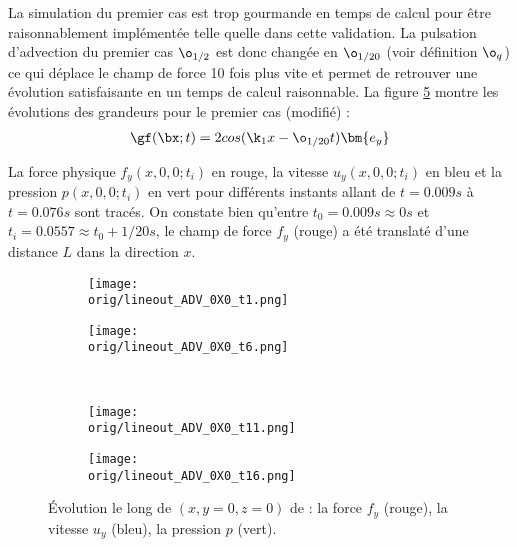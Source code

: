 La simulation du premier cas est trop gourmande en temps de calcul pour être raisonnablement implémentée telle quelle dans cette validation. La pulsation d'advection du premier cas $\o_{1/2}$ est donc changée en $\o_{1/20}$ (voir définition $\o_q$) ce qui déplace le champ de force 10 fois plus vite et permet de retrouver une évolution satisfaisante en un temps de calcul raisonnable. La figure \ref{fig : 0X0} montre les évolutions des grandeurs pour le premier cas (modifié) :
\begin{align}
\gf(\bx;t) = 2cos(\k_1 x - \o_{1/20}t) \bm{e_y}
\end{align} 

La force physique $f_y(x,0,0;t_i)$ en rouge, la vitesse $u_y(x,0,0;t_i)$ en bleu et la pression $p(x,0,0;t_i)$ en vert pour différents instants allant de $t=0.009s$ à $t=0.076s$ sont tracés. On constate bien qu'entre $t_0=0.009s \approx 0s$ et $t_i = 0.0557 \approx t_0 + 1/20 s$, le champ de force $f_y$ (rouge) a été translaté d'une distance $L$ dans la direction $x$. 

\begin{figure}
\begin{center}
	\begin{subfigure}[t]{0.4\textwidth}                                                                                                                                   
		\texttt{[image: \\orig/lineout\_ADV\_0X0\_t1.png]}
		\label{fig : 0X0_t1}
	\end{subfigure}\hfill
	\begin{subfigure}[t]{0.4\textwidth}
		\texttt{[image: \\orig/lineout\_ADV\_0X0\_t6.png]}
		\label{fig : 0X0_t6}
	\end{subfigure}
\\
	\begin{subfigure}[t]{0.4\textwidth}
		\texttt{[image: \\orig/lineout\_ADV\_0X0\_t11.png]}
		\label{fig : 0X0_t11}
	\end{subfigure}\hfill
	\begin{subfigure}[t]{0.4\textwidth}
		\texttt{[image: \\orig/lineout\_ADV\_0X0\_t16.png]}
		\label{fig : 0X0_t16}
	\end{subfigure}
\end{center}
\caption{Évolution le long de $(x,y=0,z=0)$ de : la force $f_y$ (rouge), la vitesse $u_y$ (bleu), la pression $p$ (vert).}
\label{fig : 0X0}
\end{figure}

